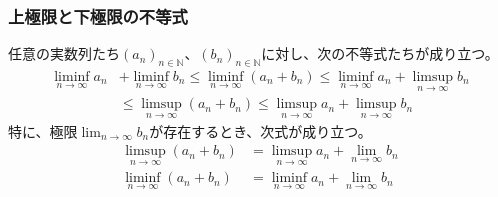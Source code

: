\documentclass[dvipdfmx]{jsarticle}
\begin{document}
\subsubsection{上極限と下極限の不等式}%
\begin{thm}\label{4.1.6.6}
任意の実数列たち$\left( a_{n} \right)_{n \in \mathbb{N}}$、$\left( b_{n} \right)_{n \in \mathbb{N}}$に対し、次の不等式たちが成り立つ。
\begin{align*}
\liminf_{n \rightarrow \infty}a_{n} &+ \liminf_{n \rightarrow \infty}b_{n} \leq \liminf_{n \rightarrow \infty}\left( a_{n} + b_{n} \right) \leq \liminf_{n \rightarrow \infty}a_{n} + \limsup_{n \rightarrow \infty}b_{n}\\
&\leq \limsup_{n \rightarrow \infty}\left( a_{n} + b_{n} \right) \leq \limsup_{n \rightarrow \infty}a_{n} + \limsup_{n \rightarrow \infty}b_{n}
\end{align*}
特に、極限$\lim_{n \rightarrow \infty}b_{n}$が存在するとき、次式が成り立つ。
\begin{align*}
\limsup_{n \rightarrow \infty}\left( a_{n} + b_{n} \right) &= \limsup_{n \rightarrow \infty}a_{n} + \lim_{n \rightarrow \infty}b_{n}\\
\liminf_{n \rightarrow \infty}\left( a_{n} + b_{n} \right) &= \liminf_{n \rightarrow \infty}a_{n} + \lim_{n \rightarrow \infty}b_{n}
\end{align*}
\end{thm}
\end{document}

